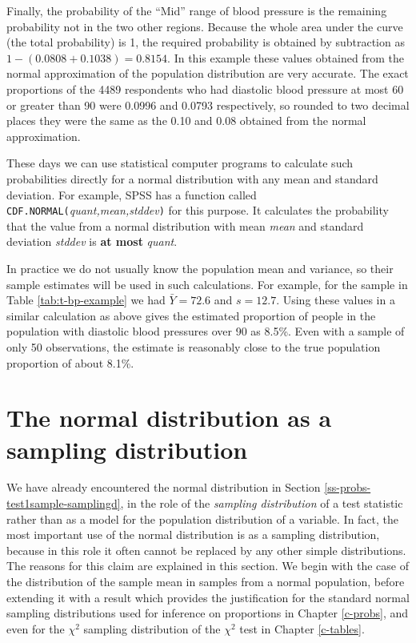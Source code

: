 \documentclass[11pt,a4paper,openany]{book}
\begin{document}
Finally, the probability of the ``Mid'' range of blood pressure is the
remaining probability not in the two other regions. Because the whole
area under the curve (the total probability) is 1, the required
probability is obtained by subtraction as \(1-(0.0808+0.1038)=0.8154\).
In this example these values obtained from the normal approximation of
the population distribution are very accurate. The exact proportions of
the 4489 respondents who had diastolic blood pressure at most 60 or
greater than 90 were 0.0996 and 0.0793 respectively, so rounded to two
decimal places they were the same as the 0.10 and 0.08 obtained from the
normal approximation.

These days we can use statistical computer programs to calculate such
probabilities directly for a normal distribution with any mean and
standard deviation. For example, SPSS has a function called
\texttt{CDF.NORMAL(}\emph{quant,mean,stddev}\texttt{)} for this purpose.
It calculates the probability that the value from a normal distribution
with mean \emph{mean} and standard deviation \emph{stddev} is \textbf{at
most} \emph{quant}.

In practice we do not usually know the population mean and variance, so
their sample estimates will be used in such calculations. For example,
for the sample in Table \ref{tab:t-bp-example} we had \(\bar{Y}=72.6\)
and \(s=12.7\). Using these values in a similar calculation as above
gives the estimated proportion of people in the population with
diastolic blood pressures over 90 as 8.5\%. Even with a sample of only
50 observations, the estimate is reasonably close to the true population
proportion of about 8.1\%.

\section{The normal distribution as a sampling
distribution}\label{s-contd-clt}

We have already encountered the normal distribution in Section
\ref{ss-probs-test1sample-samplingd}, in the role of the \emph{sampling
distribution} of a test statistic rather than as a model for the
population distribution of a variable. In fact, the most important use
of the normal distribution is as a sampling distribution, because in
this role it often cannot be replaced by any other simple distributions.
The reasons for this claim are explained in this section. We begin with
the case of the distribution of the sample mean in samples from a normal
population, before extending it with a result which provides the
justification for the standard normal sampling distributions used for
inference on proportions in Chapter \ref{c-probs}, and even for the
\(\chi^{2}\) sampling distribution of the \(\chi^{2}\) test in Chapter
\ref{c-tables}.
\end{document}
